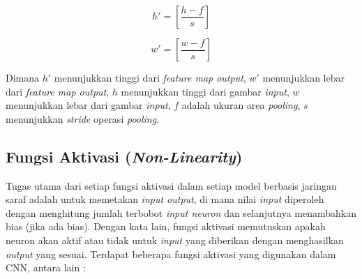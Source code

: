 \begin{equation}
	h'= \left[ \frac{h-f}{s} \right]
\end{equation}

\begin{equation}
	w'= \left[ \frac{w-f}{s} \right]
\end{equation}

Dimana $h'$ menunjukkan tinggi dari \textit{feature map output}, $w'$ menunjukkan lebar dari \textit{feature map output}, $h$ menunjukkan tinggi dari gambar \textit{input}, $w$ menunjukkan lebar dari gambar \textit{input}, $f$ adalah ukuran area \textit{pooling}, $s$ menunjukkan \textit{stride} operasi \textit{pooling}.

\subsection{Fungsi Aktivasi (\textit{Non-Linearity})}
\label{subsec:fungsi-aktivasi}

Tugas utama dari setiap fungsi aktivasi dalam setiap model berbasis jaringan saraf adalah untuk memetakan \textit{input output}, di mana nilai \textit{input} diperoleh dengan menghitung jumlah terbobot \textit{input neuron} dan selanjutnya menambahkan bias (jika ada bias). Dengan kata lain, fungsi aktivasi memutuskan apakah neuron akan aktif atau tidak untuk \textit{input} yang diberikan dengan menghasilkan \textit{output} yang sesuai. Terdapat beberapa fungsi aktivasi yang digunakan dalam CNN, antara lain :

